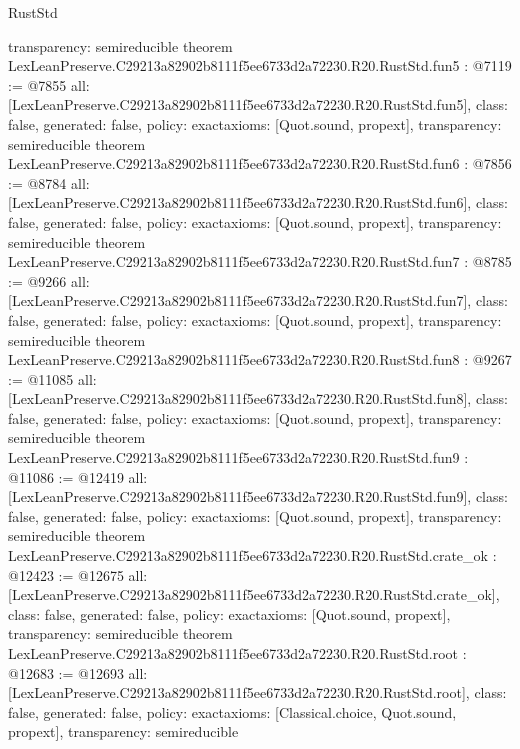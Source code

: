 \begin{lexlean}{RustStd}
\begin{coremodule}
{  transparency: semireducible
}
theorem LexLeanPreserve.C29213a82902b8111f5ee6733d2a72230.R20.RustStd.fun5 : @7119 := @7855 {
  all: [LexLeanPreserve.C29213a82902b8111f5ee6733d2a72230.R20.RustStd.fun5],
  class: false,
  generated: false,
  policy: exact{axioms: [Quot.sound, propext]},
  transparency: semireducible
}
theorem LexLeanPreserve.C29213a82902b8111f5ee6733d2a72230.R20.RustStd.fun6 : @7856 := @8784 {
  all: [LexLeanPreserve.C29213a82902b8111f5ee6733d2a72230.R20.RustStd.fun6],
  class: false,
  generated: false,
  policy: exact{axioms: [Quot.sound, propext]},
  transparency: semireducible
}
theorem LexLeanPreserve.C29213a82902b8111f5ee6733d2a72230.R20.RustStd.fun7 : @8785 := @9266 {
  all: [LexLeanPreserve.C29213a82902b8111f5ee6733d2a72230.R20.RustStd.fun7],
  class: false,
  generated: false,
  policy: exact{axioms: [Quot.sound, propext]},
  transparency: semireducible
}
theorem LexLeanPreserve.C29213a82902b8111f5ee6733d2a72230.R20.RustStd.fun8 : @9267 := @11085 {
  all: [LexLeanPreserve.C29213a82902b8111f5ee6733d2a72230.R20.RustStd.fun8],
  class: false,
  generated: false,
  policy: exact{axioms: [Quot.sound, propext]},
  transparency: semireducible
}
theorem LexLeanPreserve.C29213a82902b8111f5ee6733d2a72230.R20.RustStd.fun9 : @11086 := @12419 {
  all: [LexLeanPreserve.C29213a82902b8111f5ee6733d2a72230.R20.RustStd.fun9],
  class: false,
  generated: false,
  policy: exact{axioms: [Quot.sound, propext]},
  transparency: semireducible
}
theorem LexLeanPreserve.C29213a82902b8111f5ee6733d2a72230.R20.RustStd.crate_ok : @12423 := @12675 {
  all: [LexLeanPreserve.C29213a82902b8111f5ee6733d2a72230.R20.RustStd.crate_ok],
  class: false,
  generated: false,
  policy: exact{axioms: [Quot.sound, propext]},
  transparency: semireducible
}
theorem LexLeanPreserve.C29213a82902b8111f5ee6733d2a72230.R20.RustStd.root : @12683 := @12693 {
  all: [LexLeanPreserve.C29213a82902b8111f5ee6733d2a72230.R20.RustStd.root],
  class: false,
  generated: false,
  policy: exact{axioms: [Classical.choice, Quot.sound, propext]},
  transparency: semireducible
}


\end{coremodule}
\end{lexlean}
